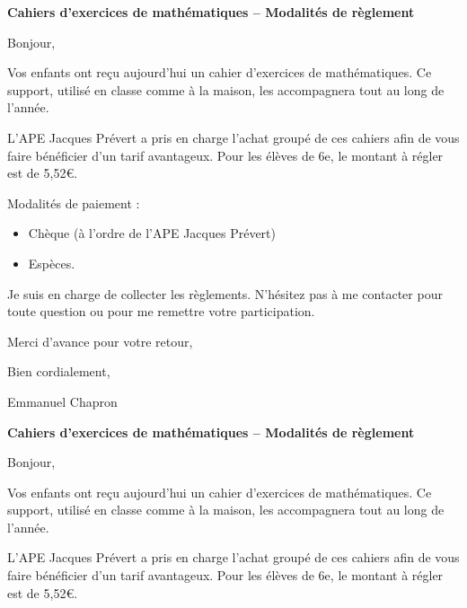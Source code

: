 \documentclass[a4paper]{book}
\begin{document}
\setcounter{chapter}{1}
\newcommand{\montant}{5,52}
\newcommand{\classe}{6e}

    \textbf{Cahiers d’exercices de mathématiques – Modalités de règlement}
    
    Bonjour,

    \medskip
    
    Vos enfants ont reçu aujourd’hui un cahier d’exercices de mathématiques. Ce support, utilisé en classe comme à la maison, les accompagnera tout au long de l’année.

    \medskip

    L’APE Jacques Prévert a pris en charge l’achat groupé de ces cahiers afin de vous faire bénéficier d’un tarif avantageux. Pour les élèves de \classe, le montant à régler est de \montant €.
    
    \medskip

    Modalités de paiement :
    \begin{itemize}
        \item Chèque (à l’ordre de l’APE Jacques Prévert)
        \item Espèces.
    \end{itemize}

    \medskip
    
    Je suis en charge de collecter les règlements. N’hésitez pas à me contacter pour toute question ou pour me remettre votre participation.
    
    Merci d’avance pour votre retour,
    
    Bien cordialement,
    
    Emmanuel Chapron


    \vspace{2cm}
    

    \textbf{Cahiers d’exercices de mathématiques – Modalités de règlement}
    
    Bonjour,

    \medskip
    
    Vos enfants ont reçu aujourd’hui un cahier d’exercices de mathématiques. Ce support, utilisé en classe comme à la maison, les accompagnera tout au long de l’année.

    \medskip

    L’APE Jacques Prévert a pris en charge l’achat groupé de ces cahiers afin de vous faire bénéficier d’un tarif avantageux. Pour les élèves de \classe, le montant à régler est de \montant €.
    
    \medskip
\end{document}
